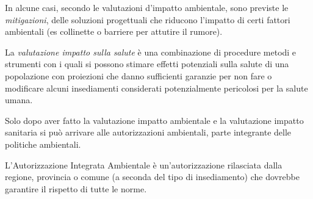 In alcune casi, secondo le valutazioni d'impatto ambientale, sono
previste le \emph{mitigazioni}, delle soluzioni progettuali che riducono
l'impatto di certi fattori ambientali (es collinette o barriere per
attutire il rumore).

La \emph{valutazione impatto sulla salute} è una combinazione di
procedure metodi e strumenti con i quali si possono stimare effetti
potenziali sulla salute di una popolazione con proiezioni che danno
sufficienti garanzie per non fare o modificare alcuni insediamenti
considerati potenzialmente pericolosi per la salute umana.

Solo dopo aver fatto la valutazione impatto ambientale e la valutazione
impatto sanitaria si può arrivare alle autorizzazioni ambientali, parte
integrante delle politiche ambientali.

L'Autorizzazione Integrata Ambientale è un'autorizzazione rilasciata
dalla regione, provincia o comune (a seconda del tipo di insediamento)
che dovrebbe garantire il rispetto di tutte le norme.
